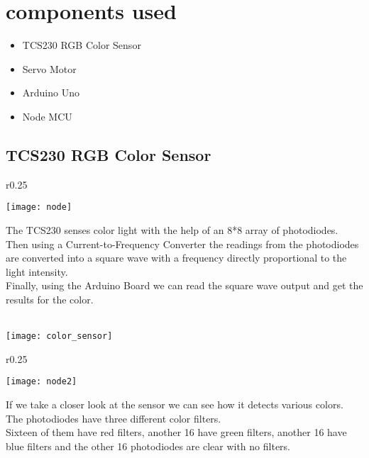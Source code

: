 \section{components used}

\begin{itemize}
    \item TCS230 RGB Color Sensor
    \item Servo Motor
    \item Arduino Uno
    \item Node MCU
\end{itemize}

\subsection{TCS230 RGB Color Sensor}

\begin{wrapfigure}{r}{0.25\textwidth}
    \begin{center}
      \texttt{[image: node]}
    \end{center}
  \end{wrapfigure}

The TCS230 senses color light with the help of an 8*8 array of
photodiodes.\\
Then using a Current-to-Frequency Converter the readings from the
photodiodes are converted into a square wave with a frequency directly
proportional to the light intensity.\\
Finally, using the Arduino Board we can read the square wave output and
get the results for the color.\\\\

\begin{center}
    
\texttt{[image: color\_sensor]}
\end{center}

\begin{wrapfigure}{r}{0.25\textwidth}
    \begin{center}
      \texttt{[image: node2]}
    \end{center}
  \end{wrapfigure}

  If we take a closer look at the sensor we can see how it detects various colors.
  The photodiodes have three different color filters.\\
  Sixteen of them have red filters, another 16 have green filters, another 16 have
  blue filters and the other 16 photodiodes are clear with no filters.\\\\\\


